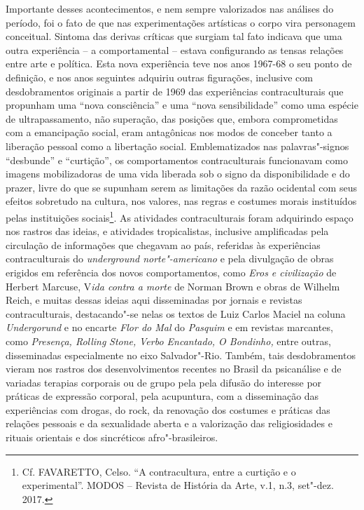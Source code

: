 Importante desses acontecimentos, e nem sempre valorizados nas análises
do período, foi o fato de que nas experimentações artísticas o corpo
vira personagem conceitual. Sintoma das derivas críticas que surgiam tal
fato indicava que uma outra experiência -- a comportamental -- estava
configurando as tensas relações entre arte e política. Esta nova
experiência teve nos anos 1967-68 o seu ponto de definição, e nos anos
seguintes adquiriu outras figurações, inclusive com desdobramentos
originais a partir de 1969 das experiências contraculturais que
propunham uma ``nova consciência'' e uma ``nova sensibilidade'' como uma
espécie de ultrapassamento, não superação, das posições que, embora
comprometidas com a emancipação social, eram antagônicas nos modos de
conceber tanto a liberação pessoal como a libertação social.
Emblematizados nas palavras"-signos ``desbunde'' e ``curtição'', os
comportamentos contraculturais funcionavam como imagens mobilizadoras de
uma vida liberada sob o signo da disponibilidade e do prazer, livre do
que se supunham serem as limitações da razão ocidental com seus efeitos
sobretudo na cultura, nos valores, nas regras e costumes morais
instituídos pelas instituições sociais\footnote{Cf. \textsc{FAVARETTO}, Celso.
  ``A contracultura, entre a curtição e o experimental''. \textsc{MODOS} --
  Revista de História da Arte, v.1, n.3, set"-dez. 2017.}. As atividades
contraculturais foram adquirindo espaço nos rastros das ideias, e
atividades tropicalistas, inclusive amplificadas pela circulação de
informações que chegavam ao país, referidas às experiências
contraculturais do \emph{underground norte"-americano} e pela divulgação
de obras erigidos em referência dos novos comportamentos, como
\emph{Eros e civilização} de Herbert Marcuse, V\emph{ida contra a morte}
de Norman Brown e obras de Wilhelm Reich, e muitas dessas ideias aqui
disseminadas por jornais e revistas contraculturais, destacando"-se nelas
os textos de Luiz Carlos Maciel na coluna \emph{Undergorund} e no
encarte \emph{Flor do Mal} do \emph{Pasquim} e em revistas marcantes,
como \emph{Presença, Rolling} \emph{Stone,} \emph{Verbo Encantado, O
Bondinho,} entre outras, disseminadas especialmente no eixo
Salvador"-Rio. Também, tais desdobramentos vieram nos rastros dos
desenvolvimentos recentes no Brasil da psicanálise e de variadas
terapias corporais ou de grupo pela pela difusão do interesse por
práticas de expressão corporal, pela acupuntura, com a disseminação das
experiências com drogas, do rock, da renovação dos costumes e práticas
das relações pessoais e da sexualidade aberta e a valorização das
religiosidades e rituais orientais e dos sincréticos afro"-brasileiros.

